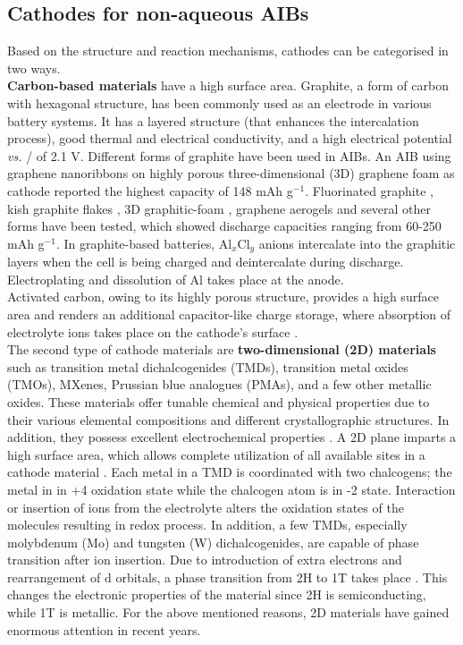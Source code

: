 \subsection{Cathodes for non-aqueous AIBs}
Based on the structure and reaction mechanisms, cathodes can be categorised in two ways.\\
\textbf{Carbon-based materials} have a high surface area. Graphite, a form of carbon with hexagonal structure, has been commonly used as an electrode in various battery systems. It has a layered structure (that enhances the intercalation process), good thermal and electrical conductivity, and a high electrical potential \textit{vs.} / of 2.1 V. Different forms of graphite have been used in AIBs. An AIB using graphene nanoribbons on highly porous three-dimensional (3D) graphene foam as cathode reported the highest capacity of 148 mAh g$^{-1}$. Fluorinated graphite \cite{rani_fluorinated_2013}, kish graphite flakes \cite{wang_kish_2017-1}, 3D graphitic-foam \cite{wu_3d_2016}, graphene aerogels\cite{huang_graphene_2019} and several other forms have been tested, which showed discharge capacities ranging from 60-250 mAh g$^{-1}$. In graphite-based batteries, Al$_x$Cl$_y$ anions intercalate into the graphitic layers when the cell is being charged and deintercalate during discharge. Electroplating and dissolution of Al takes place at the anode.\\
Activated carbon, owing to its highly porous structure, provides a high surface area and renders an additional capacitor-like charge storage, where absorption of electrolyte ions takes place on the cathode's surface \cite{eliad_ion_2001, zhu_carbon-based_2011-2}.\\
The second type of cathode materials are \textbf{two-dimensional (2D) materials} such as transition metal dichalcogenides (TMDs), transition metal oxides (TMOs), MXenes, Prussian blue analogues (PMAs), and a few other metallic oxides. These materials offer tunable chemical and physical properties due to their various elemental compositions and different crystallographic structures. In addition, they possess excellent electrochemical properties \cite{chia_electrochemistry_2015}. A 2D plane imparts a high surface area, which allows complete utilization of all available sites in a cathode material \cite{jia_interfacial_2016,naguib_mxene_2012}. Each metal in a TMD is coordinated with two chalcogens; the metal in in +4 oxidation state while the chalcogen atom is in -2 state. Interaction or insertion of ions from the electrolyte alters the oxidation states of the molecules resulting in redox process. In addition, a few TMDs, especially molybdenum (Mo) and tungsten (W) dichalcogenides, are capable of phase transition after ion insertion. Due to introduction of extra electrons and rearrangement of d orbitals, a phase transition from 2H to 1T takes place \cite{acerce}. This changes the electronic properties of the material since 2H  is semiconducting, while 1T  is metallic. For the above mentioned reasons, 2D materials have gained enormous attention in recent years. 
